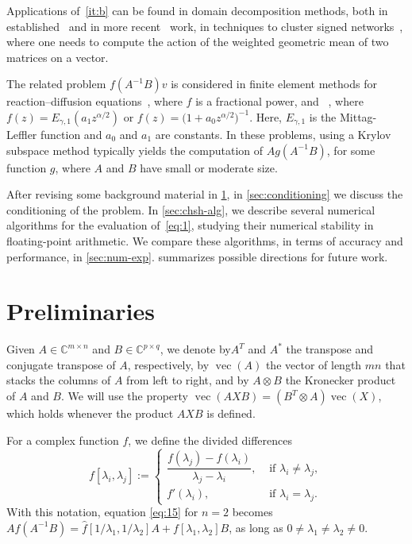 \documentclass[DIV=14]{scrartcl}
\newcommand{\C}{\ensuremath{\mathbb C}}
\newcommand{\Cmn}{\ensuremath{\C^{m \times n}}}
\newcommand{\Cpq}{\ensuremath{\C^{p \times q}}}
\theoremstyle{thmstyletwo}
\theoremstyle{definition}
\numberwithin{equation}{section}
\DeclareMathOperator{\opvec}{vec}
\newcommand{\wh}{\widehat}
\newcommand{\deq}{\ensuremath{:=}}
\begin{document}
Applications of~\ref{it:b} can be found in domain decomposition methods, both in established~\cite{alk,al1,al2} and in more recent~\cite{d1,hkmw25} work, in techniques to cluster signed networks~\cite{fi,mth1}, where one needs to compute the action of the weighted geometric mean of two matrices on a vector.

The related problem $f(A^{-1}B)v$ is considered in finite element methods for reaction--diffusion equations~\cite{bak}, where $f$ is a fractional power, and ~\cite{ytfi,ytml}, where
$f(z) = E_{\gamma,1}(a_1 z^{\alpha/2})$ or $f(z)=\bigl(1+a_0 z^{\alpha/2}\bigr)^{-1}$.
Here, $E_{\gamma,1}$ is the \mbox{Mittag-Leffler} function and $a_0$ and $a_1$ are constants.
In these problems, using a Krylov subspace method typically yields the computation of $Ag(A^{-1}B)$, for some function $g$, where $A$ and $B$ have small or moderate size.

After revising some background material in \cref{sec:preliminaries}, in \cref{sec:conditioning} we discuss the conditioning of the problem.
In \cref{sec:chsh-alg}, we describe several numerical algorithms for the evaluation of~\eqref{eq:1}, studying their numerical stability in floating-point arithmetic.
We compare these algorithms, in terms of accuracy and performance, in \cref{sec:num-exp}.
 summarizes possible directions for future work.



\section{Preliminaries}
\label{sec:preliminaries}

Given $A \in \Cmn$ and $B \in \Cpq$,
we denote by$A^T$ and $A^*$ the transpose and conjugate transpose of $A$, respectively, by $\opvec(A)$ the vector of length $mn$ that stacks the columns of $A$ from left to right, and by $A \otimes B$ the Kronecker product of $A$ and $B$. We will use the property $\opvec(AXB)=(B^T\otimes A)\opvec(X)$, which holds whenever the product $AXB$ is defined.

For a complex function $f$, we define the divided differences
\[
    f[\lambda_i,\lambda_j]\deq{}
    \begin{cases}
    \dfrac{f(\lambda_j)-f(\lambda_i)}{\lambda_j-\lambda_i}, & \mbox{ if }\lambda_i\ne \lambda_j,\\
    f'(\lambda_i), & \mbox{ if }\lambda_i=\lambda_j.
    \end{cases}
\]
With this notation, equation \eqref{eq:15} for $n=2$ becomes $Af(A^{-1}B) = \wh f[1/\lambda_1,1/\lambda_2]A+f[\lambda_1,\lambda_2]B$, as long as $0\ne \lambda_1\ne \lambda_2\ne 0$.
\end{document}
